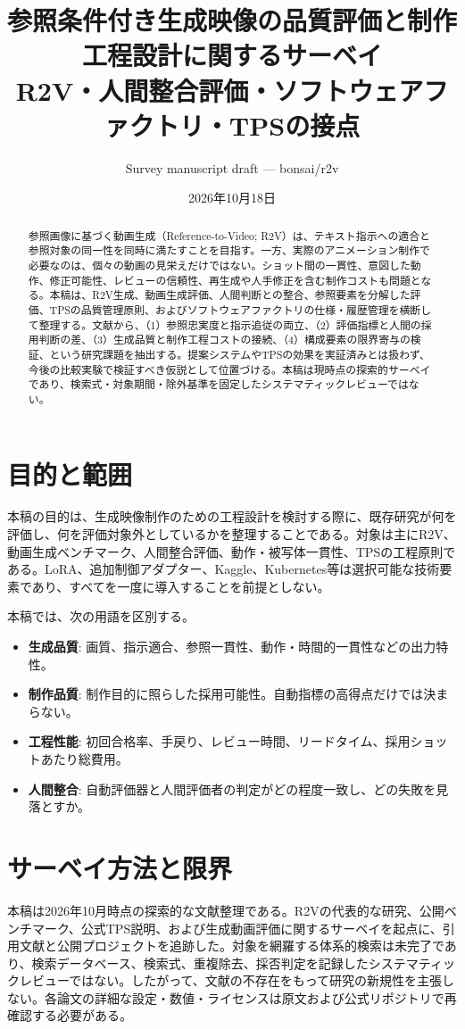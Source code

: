 \documentclass[11pt,a4paper]{article}
\title{参照条件付き生成映像の品質評価と制作工程設計に関するサーベイ\\
\large R2V・人間整合評価・ソフトウェアファクトリ・TPSの接点}
\author{Survey manuscript draft --- bonsai/r2v}
\date{2026年10月18日}
\begin{document}
\maketitle

\begin{abstract}
参照画像に基づく動画生成（Reference-to-Video; R2V）は、テキスト指示への適合と参照対象の同一性を同時に満たすことを目指す。一方、実際のアニメーション制作で必要なのは、個々の動画の見栄えだけではない。ショット間の一貫性、意図した動作、修正可能性、レビューの信頼性、再生成や人手修正を含む制作コストも問題となる。本稿は、R2V生成、動画生成評価、人間判断との整合、参照要素を分解した評価、TPSの品質管理原則、およびソフトウェアファクトリの仕様・履歴管理を横断して整理する。文献から、（1）参照忠実度と指示追従の両立、（2）評価指標と人間の採用判断の差、（3）生成品質と制作工程コストの接続、（4）構成要素の限界寄与の検証、という研究課題を抽出する。提案システムやTPSの効果を実証済みとは扱わず、今後の比較実験で検証すべき仮説として位置づける。本稿は現時点の探索的サーベイであり、検索式・対象期間・除外基準を固定したシステマティックレビューではない。
\end{abstract}

\section{目的と範囲}
本稿の目的は、生成映像制作のための工程設計を検討する際に、既存研究が何を評価し、何を評価対象外としているかを整理することである。対象は主にR2V、動画生成ベンチマーク、人間整合評価、動作・被写体一貫性、TPSの工程原則である。LoRA、追加制御アダプター、Kaggle、Kubernetes等は選択可能な技術要素であり、すべてを一度に導入することを前提としない。

本稿では、次の用語を区別する。
\begin{itemize}[nosep]
\item \textbf{生成品質}: 画質、指示適合、参照一貫性、動作・時間的一貫性などの出力特性。
\item \textbf{制作品質}: 制作目的に照らした採用可能性。自動指標の高得点だけでは決まらない。
\item \textbf{工程性能}: 初回合格率、手戻り、レビュー時間、リードタイム、採用ショットあたり総費用。
\item \textbf{人間整合}: 自動評価器と人間評価者の判定がどの程度一致し、どの失敗を見落とすか。
\end{itemize}

\section{サーベイ方法と限界}
本稿は2026年10月時点の探索的な文献整理である。R2Vの代表的な研究、公開ベンチマーク、公式TPS説明、および生成動画評価に関するサーベイを起点に、引用文献と公開プロジェクトを追跡した。対象を網羅する体系的検索は未完了であり、検索データベース、検索式、重複除去、採否判定を記録したシステマティックレビューではない。したがって、文献の不存在をもって研究の新規性を主張しない。各論文の詳細な設定・数値・ライセンスは原文および公式リポジトリで再確認する必要がある。
\end{document}
